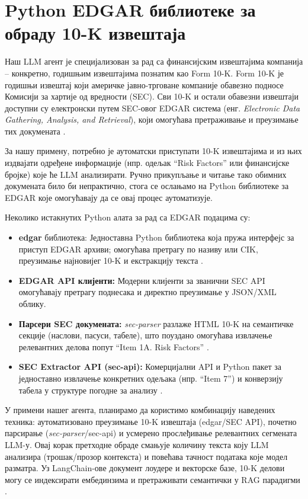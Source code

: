 \section{Python EDGAR библиотеке за обраду 10-K извештаја}

Наш LLM агент је специјализован за рад са финансијским извештајима компанија -- конкретно, годишњим извештајима познатим као Form 10-K. Form 10-K је годишњи извештај који америчке јавно-трговане компаније обавезно подносе Комисији за хартије од вредности (SEC). Сви 10-K и остали обавезни извештаји доступни су електронски путем SEC-овог EDGAR система (енг. \textit{Electronic Data Gathering, Analysis, and Retrieval}), који омогућава претраживање и преузимање тих докумената \cite{wikipedia_form_10k_2025}.

За нашу примену, потребно је аутоматски приступати 10-K извештајима и из њих издвајати одређене информације (нпр. одељак ``Risk Factors'' или финансијске бројке) које ће LLM анализирати. Ручно прикупљање и читање тако обимних докумената било би непрактично, стога се ослањамо на Python библиотеке за EDGAR које омогућавају да се овај процес аутоматизује.

Неколико истакнутих Python алата за рад са EDGAR подацима су:
\begin{itemize}
    \item \textbf{edgar} библиотека: Једноставна Python библиотека која пружа интерфејс за приступ EDGAR архиви; омогућава претрагу по називу или CIK, преузимање најновијег 10-K и екстракцију текста \cite{pypi_edgar_2024}.
    \item \textbf{EDGAR API клијенти:} Модерни клијенти за званични SEC API омогућавају претрагу поднесака и директно преузимање у JSON/XML облику.
    \item \textbf{Парсери SEC докумената:} \textit{sec-parser} разлаже HTML 10-K на семантичке секције (наслови, пасуси, табеле), што поуздано омогућава извлачење релевантних делова попут ``Item 1A. Risk Factors'' \cite{sec_parser_docs_2023}.
    \item \textbf{SEC Extractor API (sec-api):} Комерцијални API и Python пакет за једноставно извлачење конкретних одељака (нпр. ``Item 7'') и конверзију табела у структуре погодне за анализу \cite{sec_api_tutorial_2023}.
\end{itemize}

У примени нашег агента, планирамо да користимо комбинацију наведених техника: аутоматизовано преузимање 10-K извештаја (edgar/SEC API), почетно парсирање (\textit{sec-parser}/sec-api) и усмерено прослеђивање релевантних сегмената LLM-у. Овај корак претходне обраде смањује количину текста коју LLM анализира (трошак/прозор контекста) и повећава тачност података које модел разматра. Уз LangChain-ове документ лоудере и векторске базе, 10-K делови могу се индексирати ембединзима и претраживати семантички у RAG парадигми \cite{ibm_what_is_langchain_2023,patriwala_langchain_2025}.


